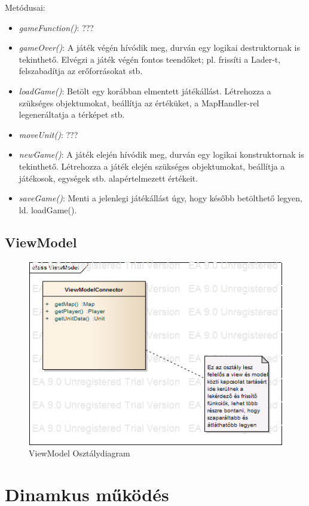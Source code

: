 \documentclass[a4paper,12pt]{report}
\begin{document}
Metódusai:
\begin{itemize}
\item \textit{gameFunction()}: ???
\item \textit{gameOver()}: A játék végén hívódik meg, durván egy logikai destruktornak is tekinthető. Elvégzi a játék végén fontos teendőket; pl. frissíti a Lader-t, felszabadítja az erőforrásokat stb.
\item \textit{loadGame()}: Betölt egy korábban elmentett játékállást. Létrehozza a szükséges objektumokat, beállítja az értéküket, a MapHandler-rel legeneráltatja a térképet stb.
\item \textit{moveUnit()}: ???
\item \textit{newGame()}: A játék elején hívódik meg, durván egy logikai konstruktornak is tekinthető. Létrehozza a játék elején szükséges objektumokat, beállítja a játékosok, egységek stb. alapértelmezett értékeit.
\item \textit{saveGame()}: Menti a jelenlegi játékállást úgy, hogy később betölthető legyen, ld. loadGame().
\end{itemize}

\subsection{ViewModel}

\begin{figure}[hbtp]
\centering
\includegraphics[width=1\textwidth]{ViewModelClass.png}
\caption{ViewModel Osztálydiagram}
\label{fig:vmc}
\end{figure}

\section{Dinamkus működés}
\end{document}
